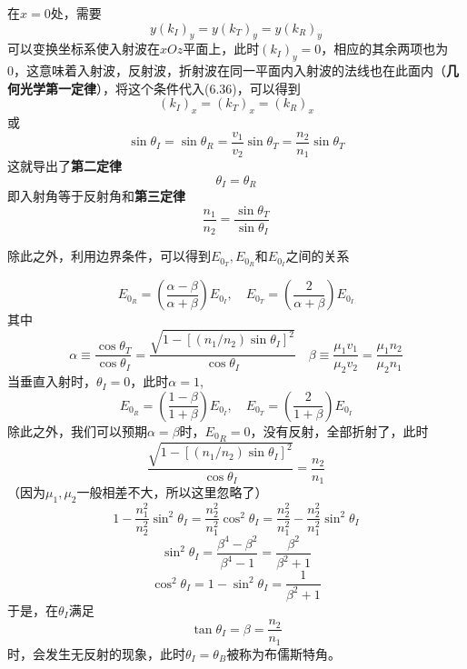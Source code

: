 \documentclass[14pt,oneside]{book}
\begin{document}
\begin{large}
在$x=0$处，需要
\begin{equation}
  y(k_I)_y=y(k_T)_y=y(k_R)_y
\end{equation}
可以变换坐标系使入射波在$xOz$平面上，此时$(k_I)_y=0$，相应的其余两项也为0，这意味着入射波，反射波，折射波在同一平面内入射波的法线也在此面内（\textbf{几何光学第一定律}），将这个条件代入(6.36)，可以得到
\begin{equation}
  (k_I)_x=(k_T)_x=(k_R)_x
\end{equation}
或
\begin{equation}
  \sin\theta_I=\sin\theta_R=\frac{v_1}{v_2}\sin\theta_T=\frac{n_2}{n_1}\sin\theta_T
\end{equation}
这就导出了\textbf{第二定律}
\begin{equation}
 \theta_I=\theta_R
\end{equation}
即入射角等于反射角和\textbf{第三定律}
\begin{equation}
  \frac{n_1}{n_2}=\frac{\sin\theta_T}{\sin\theta_I}
\end{equation}

除此之外，利用边界条件，可以得到$E_{0_T},E_{0_R}$和$E_{0_I}$之间的关系

\begin{equation}
{E}_{0_R}=\left(\frac{\alpha-\beta}{\alpha+\beta}\right) {E}_{0_I}, \quad {E}_{0_T}=\left(\frac{2}{\alpha+\beta}\right) {E}_{0_I}
\end{equation}
其中
\begin{equation}
\alpha \equiv \frac{\cos \theta_T}{\cos \theta_I}=\frac{\sqrt{1-\left[\left(n_1 / n_2\right) \sin \theta_I\right]^2}}{\cos \theta_I}\quad \beta \equiv \frac{\mu_1 v_1}{\mu_2 v_2}=\frac{\mu_1 n_2}{\mu_2 n_1}
\end{equation}
当垂直入射时，$\theta_I=0$，此时$\alpha=1$,
\begin{equation}
{E}_{0_R}=\left(\frac{1-\beta}{1+\beta}\right) {E}_{0_I}, \quad {E}_{0_T}=\left(\frac{2}{1+\beta}\right) {E}_{0_I}
\end{equation}
除此之外，我们可以预期$\alpha=\beta$时，${E_0}_R=0$，没有反射，全部折射了，此时
\begin{equation}
  \frac{\sqrt{1-\left[\left(n_1 / n_2\right) \sin \theta_I\right]^2}}{\cos \theta_I}=\frac{n_2}{n_1}
\end{equation}
（因为$\mu_1,\mu_2$一般相差不大，所以这里忽略了）
\begin{equation}
  1-\frac{n_1^2}{n_2^2}\sin^2\theta_I=\frac{n_2^2}{n_1^2}\cos^2\theta_I=\frac{n_2^2}{n_1^2}-\frac{n_2^2}{n_1^2}\sin^2\theta_I
\end{equation}
\begin{equation}
  \sin^2\theta_I=\frac{\beta^4-\beta^2}{\beta^4-1}=\frac{\beta^2}{\beta^2+1}
\end{equation}
\begin{equation}
  \cos^2\theta_I=1-\sin^2\theta_I=\frac{1}{\beta^2+1}
\end{equation}
于是，在$\theta_I$满足
\begin{equation}
  \tan\theta_I=\beta=\frac{n_2}{n_1}
\end{equation}
时，会发生无反射的现象，此时$\theta_I=\theta_B$被称为布儒斯特角。


\end{large}
\end{document}
